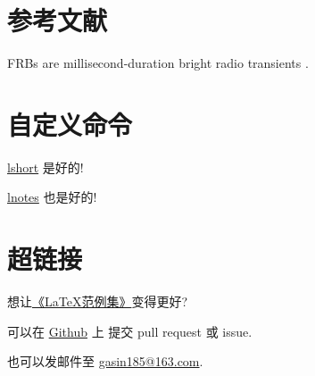 \documentclass{ctexart}
\begin{document}
    \section{参考文献}
    FRBs are millisecond-duration bright radio transients
    \cite{Li2018,Lin2020}.
    
    
    \section{自定义命令}
    \def\lshortURL{https://www.ctan.org/pkg/lshort}
    \def\lnotesURL{https://github.com/huangxg/lnotes}
    \newcommand{\isgood}[3][是好的]{\href{#3}{#2} #1!}

    \isgood{lshort}{\lshortURL}

    \isgood[也是好的]{lnotes}{\lnotesURL}
    \section{超链接}
    想让\href{clexample.pdf}{《\LaTeX{}范例集》}变得更好?

    可以在 \href{https://github.com/GasinAn/lexamples}{Github} 上
    提交 pull request 或 issue.

    也可以发邮件至 \href{mailto:gasin185@163.com}{gasin185@163.com}.
\end{document}

